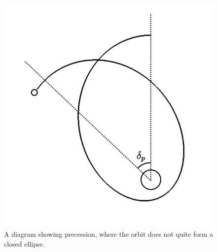 \documentclass[12pt]{article}
\begin{document}
\begin{figure} 
\centering
\label{fig4}
  \includegraphics[width = 6 in]{precession.png}
  \caption{ A diagram showing precession, where the orbit does not quite form a closed ellipse.
}
\end{figure}
\end{document}

